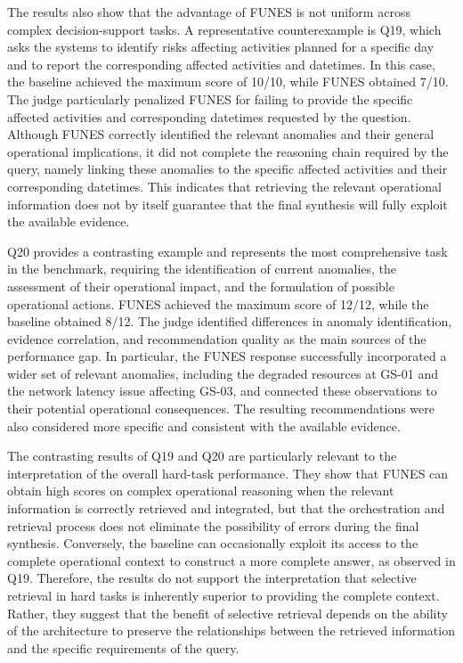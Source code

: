 The results also show that the advantage of FUNES is not uniform across complex decision-support tasks. A representative counterexample is Q19, which asks the systems to identify risks affecting activities planned for a specific day and to report the corresponding affected activities and datetimes. In this case, the baseline achieved the maximum score of 10/10, while FUNES obtained 7/10. The judge particularly penalized FUNES for failing to provide the specific affected activities and corresponding datetimes requested by the question. Although FUNES correctly identified the relevant anomalies and their general operational implications, it did not complete the reasoning chain required by the query, namely linking these anomalies to the specific affected activities and their corresponding datetimes. This indicates that retrieving the relevant operational information does not by itself guarantee that the final synthesis will fully exploit the available evidence.

Q20 provides a contrasting example and represents the most comprehensive task in the benchmark, requiring the identification of current anomalies, the assessment of their operational impact, and the formulation of possible operational actions. FUNES achieved the maximum score of 12/12, while the baseline obtained 8/12. The judge identified differences in anomaly identification, evidence correlation, and recommendation quality as the main sources of the performance gap. In particular, the FUNES response successfully incorporated a wider set of relevant anomalies, including the degraded resources at GS-01 and the network latency issue affecting GS-03, and connected these observations to their potential operational consequences. The resulting recommendations were also considered more specific and consistent with the available evidence.

The contrasting results of Q19 and Q20 are particularly relevant to the interpretation of the overall hard-task performance. They show that FUNES can obtain high scores on complex operational reasoning when the relevant information is correctly retrieved and integrated, but that the orchestration and retrieval process does not eliminate the possibility of errors during the final synthesis. Conversely, the baseline can occasionally exploit its access to the complete operational context to construct a more complete answer, as observed in Q19. Therefore, the results do not support the interpretation that selective retrieval in hard tasks is inherently superior to providing the complete context. Rather, they suggest that the benefit of selective retrieval depends on the ability of the architecture to preserve the relationships between the retrieved information and the specific requirements of the query.

